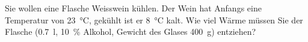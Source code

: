
\begin{aufgabe}
Sie wollen eine Flasche Weisswein kühlen. Der Wein hat Anfangs eine Temperatur von \SI{23}{\celsius}, gekühlt ist er \SI{8}{\celsius} kalt.
Wie viel Wärme müssen Sie der Flasche (\SI{0.7}{l}, \SI{10}{\percent} Alkohol, Gewicht des Glases \SI{400}{g}) entziehen?


\begin{loesung}
\end{loesung}

\end{aufgabe}

